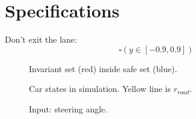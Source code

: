 \documentclass[letterpaper, 12pt]{article}
\newlength{\figurewidth}
\newlength{\figureheight}
\begin{document}
\section{Specifications} %
\label{sec:specifications}

Don't exit the lane:
\begin{equation}
	\square (y \in [-0.9, 0.9])
\end{equation}


\setlength{} 
\setlength{} 

\begin{figure}[h]
	\begin{center}
		
	\end{center}
	\caption{Invariant set (red) inside safe set (blue).}
	\label{fig:invariant}
\end{figure}

\setlength{} 
\setlength{} 

\begin{figure}[h]
	\begin{center}
		
	\end{center}
	\caption{Car states in simulation. Yellow line is $r_{road}$.}
	\label{fig:invariant}
\end{figure}
\setlength{} 
\setlength{} 

\begin{figure}[h]
	\begin{center}
		
	\end{center}
	\caption{Input: steering angle.}
	\label{fig:invariant}
\end{figure}
\end{document}
